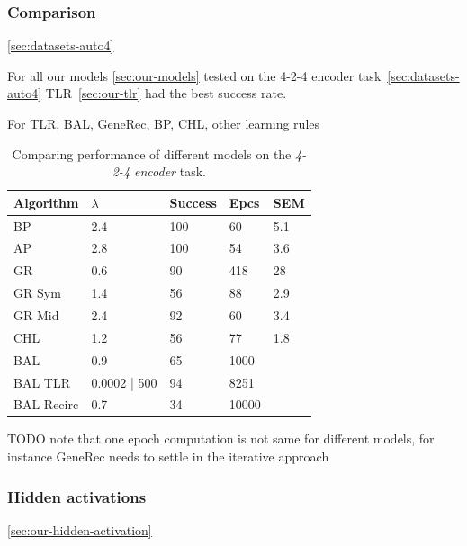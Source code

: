 \subsubsection{Comparison} 
\ref{sec:datasets-auto4} 

For all our models \ref{sec:our-models} tested on the 4-2-4 encoder task~\ref{sec:datasets-auto4} TLR~\ref{sec:our-tlr} had the best success rate. 

For TLR, BAL, GeneRec, BP, CHL, other learning rules

\begin{table}
  \centering
    \begin{tabular}{|l|l|l|l|l|}
    \hline
    Algorithm&$\lambda$&Success&Epcs&SEM \\
    \hline
    BP&2.4&100&60&5.1\\
    \hline
    AP&2.8&100&54&3.6\\
    \hline
    GR&0.6&90&418&28\\
    \hline
    GR Sym&1.4&56&88&2.9\\
    \hline
    GR Mid&2.4&92&60&3.4\\
    \hline
    CHL&1.2&56&77&1.8\\
    \hline
    BAL&0.9&65&1000&\\
    \hline
    BAL TLR&0.0002 | 500&94&8251&\\
    \hline
    BAL Recirc&0.7&34&10000&\\
    \hline
    \end{tabular}
  \caption{Comparing performance of different models on the \emph{4-2-4 encoder} task.} 
  \label{tab:results-cmp-auto4}
\end{table}

TODO note that one epoch computation is not same for different models, for instance GeneRec needs to settle in the iterative approach 

\subsubsection{Hidden activations}
\ref{sec:our-hidden-activation}  


